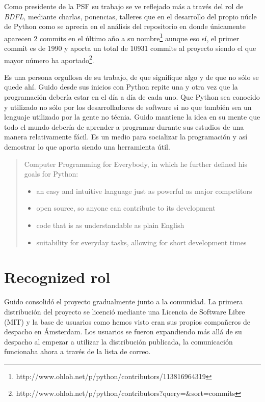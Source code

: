 \documentclass[11pt]{scrartcl}
\begin{document}
Como presidente de la PSF su trabajo se ve reflejado más a través del rol de \emph{BDFL}, mediante charlas, ponencias, talleres que en el desarrollo del propio núcle de Python como se aprecia en el análisis del repositorio en donde únicamente aparecen 2 commits en el último año a su nombre\footnote{http://www.ohloh.net/p/python/contributors/113816964319} aunque eso sí, el primer commit es de 1990 y aporta un total de 10931 commits al proyecto siendo el que mayor número ha aportado\footnote{http://www.ohloh.net/p/python/contributors?query=\&sort=commits}.

Es una persona orgullosa de su trabajo, de que signifique algo y de que no sólo se quede ahí. Guido desde sus inicios con Python repite una y otra vez que la programación debería estar en el día a día de cada uno. Que Python sea conocido y utilizado no sólo por los desarrolladores de software si no que también sea un lenguaje utilizado por la gente no técnia. Guido mantiene la idea en su mente que todo el mundo debería de aprender a programar durante sus estudios de una manera relativamente fácil. Es un medio para socializar la programación y así demostrar lo que aporta siendo una herramienta útil.

\begin{quotation}
Computer Programming for Everybody, in which he further defined his goals for Python:
    \begin{itemize}
        \item an easy and intuitive language just as powerful as major competitors
        \item open source, so anyone can contribute to its development
        \item code that is as understandable as plain English
        \item suitability for everyday tasks, allowing for short development times
    \end{itemize}
\end{quotation}

\section{Recognized rol}

Guido consolidó el proyecto gradualmente junto a la comunidad. La primera distribución del proyecto se licenció mediante una Licencia de Software Libre (MIT) y la base de usuarios como hemos visto eran sus propios compañeros de despacho en Ámsterdam. Los usuarios se fueron expandiendo más allá de su despacho al empezar a utilizar la distribución publicada, la comunicación funcionaba ahora a través de la lista de correo.
\end{document}
